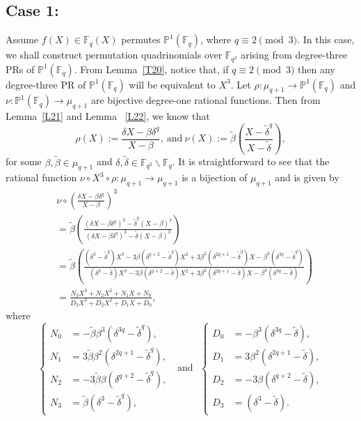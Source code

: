 \documentclass[12pt]{amsart}
\numberwithin{equation}{section}
\theoremstyle{definition}
\newcommand{\F}{\mathbb F}
\newcommand{\bP}{\mathbb P}
\begin{document}
\subsection*{Case 1:} \label{C41} Assume $f(X)\in \F_q(X)$ permutes $\bP^1(\F_q)$, where $q\equiv2\pmod3$. In this case, we shall construct permutation quadrinomials over $\F_{q^2}$ arising from degree-three PRs of $\bP^1(\F_q)$.
From Lemma~\ref{T20}, notice that, if $q\equiv 2 \pmod 3$ then any degree-three PR of $\bP^1(\F_q)$ will be equivalent to $X^3$. Let $\rho : \mu_{q+1} \rightarrow \bP^1(\F_q)$ and ${\nu} : \bP^1(\F_q) \rightarrow \mu_{q+1}$ are bijective degree-one rational functions. Then from Lemma~\ref{L21} and Lemma ~\ref{L22}, we know that
 \[
  \rho(X) := \frac{\delta X -\beta \delta^q}{X-\beta},
 ~\mbox{and}~
  {\nu}(X) := {\tilde \beta} \left(\frac{X -{\tilde \delta}^q}{X- {\tilde \delta}}\right),
 \]
 for some $\beta, {\tilde \beta} \in \mu_{q+1}$ and $\delta, {\tilde \delta} \in \F_{q^2} \backslash \F_q$. It is straightforward to see that the rational function ${\nu} \circ X^3 \circ \rho : \mu_{q+1} \rightarrow \mu_{q+1}$ is a bijection of $\mu_{q+1}$ and is given by
 \begin{equation*}
  \begin{split}
   & {\nu} \circ \left(\frac{\delta X -\beta \delta^q}{X-\beta} \right)^3 \\
   &= {\tilde \beta} \left(\frac{(\delta X -\beta \delta^q)^3 -{\tilde \delta}^q (X -\beta)^3}{(\delta X -\beta \delta^q)^3- {\tilde \delta}(X -\beta)^3}\right)\\
   &= {\tilde \beta} \left(\frac{(\delta^3-{\tilde \delta}^q) X^3  -3\beta (\delta^{q+2}-{\tilde \delta}^q)X^2+3\beta^2(\delta^{2q+1}-{\tilde \delta}^q)X -\beta^3 (\delta^{3q}-{\tilde \delta}^q)}{(\delta^3-{\tilde \delta}) X^3  -3\beta (\delta^{q+2}-{\tilde \delta})X^2 +3\beta^2(\delta^{2q+1} -{\tilde \delta})X -\beta^3 (\delta^{3q}-{\tilde \delta})}\right)\\
   &= \frac{N_3X^3+N_2X^2+N_1X+N_0}{D_3X^3+D_2X^2+D_1X+D_0},
  \end{split}
 \end{equation*}
 where
 \begin{equation}\label{C05}
  \begin{cases}
   N_0 &= -{\tilde \beta}\beta^3 (\delta^{3q}-{\tilde \delta}^q),\\
   N_1 &= 3{\tilde \beta}\beta^2(\delta^{2q+1}-{\tilde \delta}^q),\\
   N_2 &= -3{\tilde \beta}\beta (\delta^{q+2}-{\tilde \delta}^q),\\
   N_3 &= {\tilde \beta}(\delta^3-{\tilde \delta}^q),
  \end{cases}
  ~~~\mbox{and}~~~
  \begin{cases}
   D_0 &= -\beta^3 (\delta^{3q}-{\tilde \delta}),\\
   D_1 &= 3\beta^2(\delta^{2q+1}-{\tilde \delta}),\\
   D_2 &= -3\beta (\delta^{q+2}-{\tilde \delta}),\\
   D_3 &= (\delta^3-{\tilde \delta}).
  \end{cases}
 \end{equation}
\end{document}
